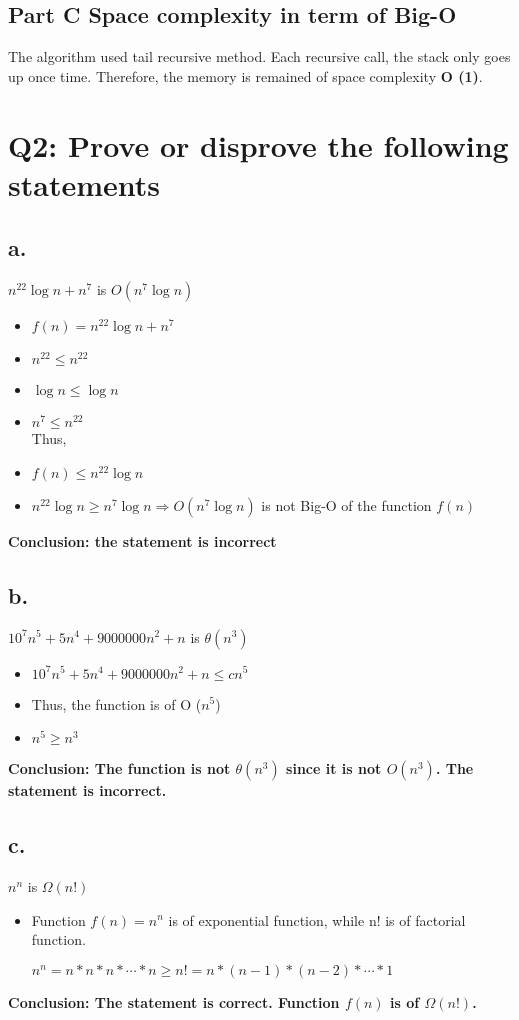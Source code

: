 \documentclass{article}
\begin{document}
\subsection*{Part C\: Space complexity in term of Big-O}
The algorithm used tail recursive method. Each recursive call, the stack only goes up once time. Therefore, the memory is remained of space complexity \textbf{O (1)}.

\section*{Q2: Prove or disprove the following statements}%
\subsection*{a.}%
$n^{22}\log n + n^7$ is $O(n^7\log n)$
\begin{itemize}
	\item[] $f(n) = n^{22}\log n + n^7$ 
	\item[] $n^{22} \leq n^{22}$ 
	\item[] $\log n \leq \log n$
	\item[]  $n^7 \leq n^{22}$
	\\
	Thus,
	\item[] $f(n) \leq n^{22} \log n $
	\item[] $n^{22}\log n \geq n^7 \log n \Rightarrow O(n^7 \log n)$ is not Big-O of the function $f(n)$
\end{itemize}
\textbf{Conclusion: the statement is incorrect}

\subsection*{b.}%
$10^7n^5 + 5n^4 + 9000000n^2 + n$ is $\theta(n^3)$
\begin{itemize}
	\item[] $10^7n^5 + 5n^4 + 9000000n^2 + n \leq cn^5 $
	\item[] Thus, the function is of O ($n^5$) 
	\item[] $n^5 \geq n^3$
\end{itemize}
\textbf{Conclusion: The function is not $\theta(n^3)$ since it is not $O (n^3)$. The statement is incorrect.}

\subsection*{c.}%
$n^n$ is $\Omega (n!)$
\begin{itemize}
	\item[] Function $f(n) = n^n$ is of exponential function, while n! is of factorial function. 

	$n^n = n * n * n * \cdots * n \geq n! = n* (n-1) * (n-2) * \cdots * 1$ 
\end{itemize}
\textbf{Conclusion: The statement is correct. Function $f(n)$ is of $\Omega(n!)$.}
\end{document}
